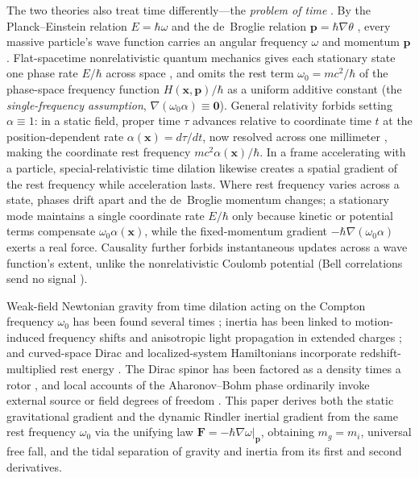 \documentclass[aps,prd,onecolumn,tightenlines,nofootinbib,notitlepage,10pt,floatfix]{revtex4-2}
\theoremstyle{indentedtheorem}
\begin{document}
The two theories also treat time differently---the \emph{problem of time} \citep{Isham1993Canonical,Kuchavr1992Time,Anderson2012Problem}. By the Planck--Einstein relation $E=\hbar\omega$ \citep{Planck1901Radiation,Einstein1905Photoelectric} and the de~Broglie relation $\mathbf{p}=\hbar\nabla\theta$ \citep{deBroglie1925Thesis}, every massive particle's wave function carries an angular frequency $\omega$ and momentum $\mathbf{p}$. Flat-spacetime nonrelativistic quantum mechanics gives each stationary state one phase rate $E/\hbar$ across space \citep{Wentzel1926WKB,Kramers1926WKB,Brillouin1926WKB,Goldstein2002Classical}, and omits the rest term $\omega_0=mc^2/\hbar$ of the phase-space frequency function $H(\mathbf{x},\mathbf{p})/\hbar$ as a uniform additive constant (the \emph{single-frequency assumption}, $\nabla(\omega_0\alpha)\equiv\mathbf{0}$). General relativity forbids setting $\alpha\equiv 1$: in a static field, proper time $\tau$ advances relative to coordinate time $t$ at the position-dependent rate $\alpha(\mathbf{x})=d\tau/dt$, now resolved across one millimeter \citep{Bothwell2022Resolving}, making the coordinate rest frequency $mc^2\alpha(\mathbf{x})/\hbar$. In a frame accelerating with a particle, special-relativistic time dilation likewise creates a spatial gradient of the rest frequency while acceleration lasts. Where rest frequency varies across a state, phases drift apart and the de~Broglie momentum changes; a stationary mode maintains a single coordinate rate $E/\hbar$ only because kinetic or potential terms compensate $\omega_0\alpha(\mathbf{x})$, while the fixed-momentum gradient $-\hbar\nabla(\omega_0\alpha)$ exerts a real force. Causality further forbids instantaneous updates across a wave function's extent, unlike the nonrelativistic Coulomb potential (Bell correlations send no signal \citep{Bell1964EPR,Aspect1982Experimental}).

Weak-field Newtonian gravity from time dilation acting on the Compton frequency $\omega_0$ has been found several times \citep{Evans2001Matter,Wootters2003Why,Mueller2014Quantum,Xu2019DeBroglie,Czarnecki2021Gravitational}; inertia has been linked to motion-induced frequency shifts \citep{Schlegel1954Wave} and anisotropic light propagation in extended charges \citep{Petkov1999Acceleration}; and curved-space Dirac and localized-system Hamiltonians incorporate redshift-multiplied rest energy \citep{HehlNi1990Inertial,Perche2022Localized}. The Dirac spinor has been factored as a density times a rotor \citep{Hestenes1967Real,Hestenes1990Zitterbewegung,LasenbyDoranGull1998Gravity}, and local accounts of the Aharonov--Bohm phase \citep{Aharonov1959Significance} ordinarily invoke external source or field degrees of freedom \citep{Vaidman2012Role,Marletto2020Aharonov}. This paper derives both the static gravitational gradient and the dynamic Rindler inertial gradient from the same rest frequency $\omega_0$ via the unifying law $\mathbf{F}=-\hbar\nabla\omega|_{\mathbf{p}}$, obtaining $m_g=m_i$, universal free fall, and the tidal separation of gravity and inertia from its first and second derivatives.
\end{document}
